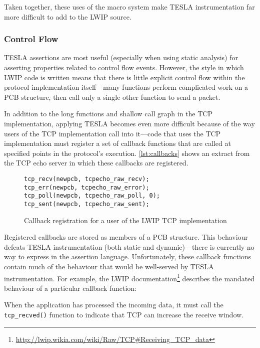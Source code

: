Taken together, these uses of the macro system make TESLA
instrumentation far more difficult to add to the LWIP source.

\subsubsection{Control Flow}

TESLA assertions are most useful (especially when using static analysis)
for asserting properties related to control flow events. However, the
style in which LWIP code is written means that there is little explicit
control flow within the protocol implementation itself---many functions
perform complicated work on a PCB structure, then call only a single
other function to send a packet.

In addition to the long functions and shallow call graph in the TCP
implementation, applying TESLA becomes even more difficult because of
the way users of the TCP implementation call into it---code that uses
the TCP implementation must register a set of callback functions that
are called at specified points in the protocol's execution.
\autoref{lst:callbacks} shows an extract from the TCP echo server in
which these callbacks are registered.

\begin{figure}
  \begin{verbatim}
tcp_recv(newpcb, tcpecho_raw_recv);
tcp_err(newpcb, tcpecho_raw_error);
tcp_poll(newpcb, tcpecho_raw_poll, 0);
tcp_sent(newpcb, tcpecho_raw_sent);
  \end{verbatim}
  \caption{Callback registration for a user of the LWIP TCP implementation}
  \label{lst:callbacks}
\end{figure}

Registered callbacks are stored as members of a PCB structure. This
behaviour defeats TESLA instrumentation (both static and
dynamic)---there is currently no way to express  in the assertion language.
Unfortunately, these callback functions contain much of the behaviour
that would be well-served by TESLA instrumentation. For example, the
LWIP
documentation\footnote{\url{http://lwip.wikia.com/wiki/Raw/TCP\#Receiving_TCP_data}}
describes the mandated behaviour of a particular callback function:

\begin{displayquote}
When the application has processed the incoming data, it must call the
\texttt{tcp_recved()} function to indicate that TCP can increase
the receive window.
\end{displayquote}

